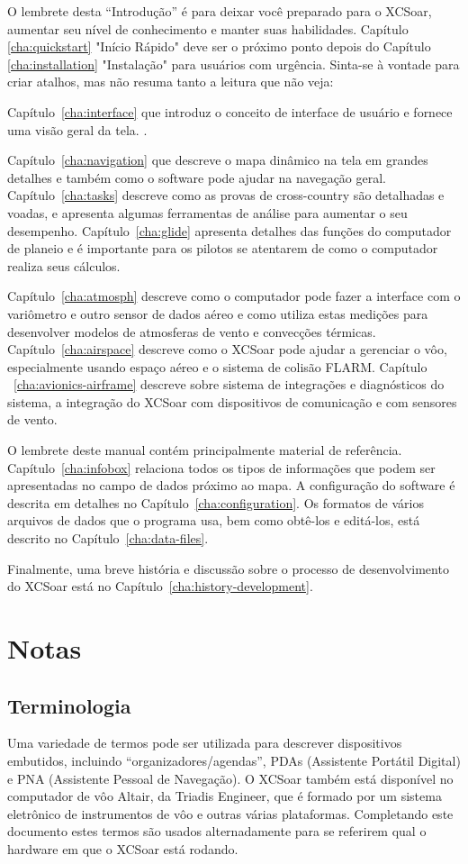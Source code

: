O lembrete desta “Introdução” é para deixar você preparado para o XCSoar, aumentar seu nível de conhecimento e manter suas habilidades.   
Capítulo \ref{cha:quickstart} "Início Rápido" deve ser o próximo ponto depois do Capítulo 
\ref{cha:installation} "Instalação" para usuários com urgência. Sinta-se à vontade para criar atalhos, mas não resuma tanto a leitura que não veja:

Capítulo~\ref{cha:interface} que introduz o conceito de interface de usuário e fornece uma visão geral da tela. .

Capítulo~\ref{cha:navigation} que descreve o mapa dinâmico na tela em grandes detalhes e também como o software pode ajudar na navegação geral.  Capítulo~\ref{cha:tasks} descreve como as provas de cross-country são detalhadas e voadas, e apresenta algumas ferramentas de análise para aumentar o seu desempenho.
Capítulo~\ref{cha:glide} apresenta detalhes das funções do computador de planeio e é importante para os pilotos se atentarem de como o computador realiza seus cálculos.

Capítulo~\ref{cha:atmosph} descreve como o computador pode fazer a interface com o variômetro e outro sensor de dados aéreo e como utiliza estas medições para desenvolver modelos de atmosferas de vento e convecções térmicas.  
Capítulo~\ref{cha:airspace} descreve como o XCSoar pode ajudar a gerenciar o vôo, especialmente usando espaço aéreo e o sistema de colisão FLARM.  Capítulo ~\ref{cha:avionics-airframe} descreve sobre sistema de integrações e diagnósticos do sistema, a integração do XCSoar com dispositivos de comunicação e com sensores de vento.

O lembrete deste manual contém principalmente material de referência.  
Capítulo~\ref{cha:infobox} relaciona todos os tipos de informações que podem ser apresentadas no campo de dados próximo ao mapa.  A configuração do software é descrita em detalhes no
Capítulo~\ref{cha:configuration}.  Os formatos de vários arquivos de dados que o programa usa, bem como obtê-los e editá-los, está descrito no Capítulo~\ref{cha:data-files}.

Finalmente, uma breve história e discussão sobre o processo de desenvolvimento do XCSoar está no Capítulo~\ref{cha:history-development}.

\section{Notas}

\subsection*{Terminologia}
Uma variedade de termos pode ser utilizada para descrever dispositivos embutidos, incluindo “organizadores/agendas”,   PDAs (Assistente Portátil Digital) e PNA (Assistente Pessoal de Navegação).  O XCSoar também está disponível no computador de vôo Altair, da Triadis Engineer, que é formado por um sistema eletrônico de instrumentos de vôo e outras várias plataformas.  
Completando este documento estes termos são usados alternadamente para se referirem qual o hardware em que o XCSoar está rodando.


